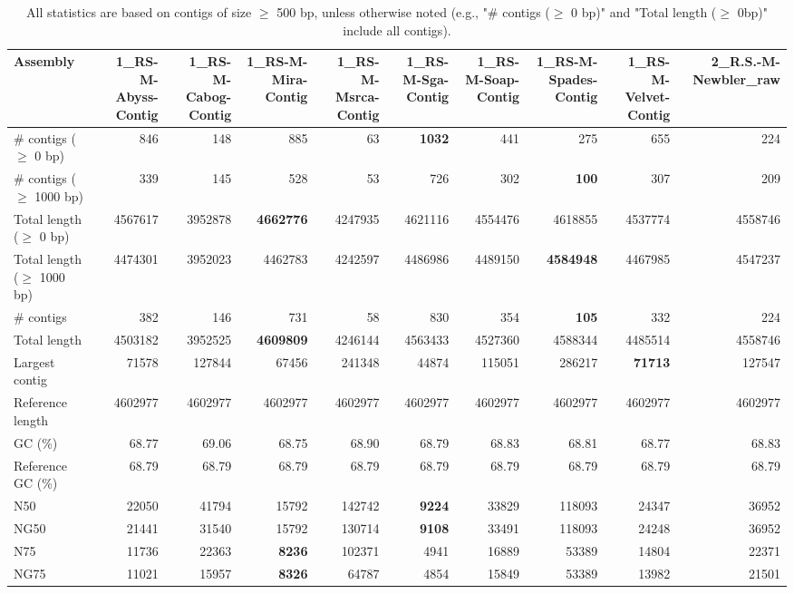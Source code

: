 \documentclass[12pt,a4paper]{article}
\begin{document}
\begin{table}[ht]
\begin{center}
\caption{All statistics are based on contigs of size $\geq$ 500 bp, unless otherwise noted (e.g., "\# contigs ($\geq$ 0 bp)" and "Total length ($\geq$ 0bp)" include all contigs).}
\begin{tabular}{|l*{9}{|r}|}
\hline
Assembly & 1\_RS-M-Abyss-Contig & 1\_RS-M-Cabog-Contig & 1\_RS-M-Mira-Contig & 1\_RS-M-Msrca-Contig & 1\_RS-M-Sga-Contig & 1\_RS-M-Soap-Contig & 1\_RS-M-Spades-Contig & 1\_RS-M-Velvet-Contig & 2\_R.S.-M-Newbler\_raw \\ \hline
\# contigs ($\geq$ 0 bp) & 846 & 148 & 885 & 63 & {\bf 1032} & 441 & 275 & 655 & 224 \\ \hline
\# contigs ($\geq$ 1000 bp) & 339 & 145 & 528 & 53 & 726 & 302 & {\bf 100} & 307 & 209 \\ \hline
Total length ($\geq$ 0 bp) & 4567617 & 3952878 & {\bf 4662776} & 4247935 & 4621116 & 4554476 & 4618855 & 4537774 & 4558746 \\ \hline
Total length ($\geq$ 1000 bp) & 4474301 & 3952023 & 4462783 & 4242597 & 4486986 & 4489150 & {\bf 4584948} & 4467985 & 4547237 \\ \hline
\# contigs & 382 & 146 & 731 & 58 & 830 & 354 & {\bf 105} & 332 & 224 \\ \hline
Total length & 4503182 & 3952525 & {\bf 4609809} & 4246144 & 4563433 & 4527360 & 4588344 & 4485514 & 4558746 \\ \hline
Largest contig & 71578 & 127844 & 67456 & 241348 & 44874 & 115051 & 286217 & {\bf 71713} & 127547 \\ \hline
Reference length & 4602977 & 4602977 & 4602977 & 4602977 & 4602977 & 4602977 & 4602977 & 4602977 & 4602977 \\ \hline
GC (\%) & 68.77 & 69.06 & 68.75 & 68.90 & 68.79 & 68.83 & 68.81 & 68.77 & 68.83 \\ \hline
Reference GC (\%) & 68.79 & 68.79 & 68.79 & 68.79 & 68.79 & 68.79 & 68.79 & 68.79 & 68.79 \\ \hline
N50 & 22050 & 41794 & 15792 & 142742 & {\bf 9224} & 33829 & 118093 & 24347 & 36952 \\ \hline
NG50 & 21441 & 31540 & 15792 & 130714 & {\bf 9108} & 33491 & 118093 & 24248 & 36952 \\ \hline
N75 & 11736 & 22363 & {\bf 8236} & 102371 & 4941 & 16889 & 53389 & 14804 & 22371 \\ \hline
NG75 & 11021 & 15957 & {\bf 8326} & 64787 & 4854 & 15849 & 53389 & 13982 & 21501 \\ \hline

\end{tabular}
\end{center}
\end{table}
\end{document}
